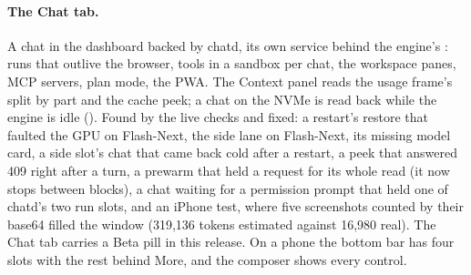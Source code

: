 \paragraph{The Chat tab.} A chat in the dashboard backed by chatd, its own service behind the engine's : runs that outlive the browser, tools in a sandbox per chat, the workspace panes, MCP servers, plan mode, the PWA. The Context panel reads the usage frame's split by part and the cache peek; a chat on the NVMe is read back while the engine is idle (). Found by the live checks and fixed: a restart's restore that faulted the GPU on Flash-Next, the side lane on Flash-Next, its missing model card, a side slot's chat that came back cold after a restart, a peek that answered 409 right after a turn, a prewarm that held a request for its whole read (it now stops between blocks), a chat waiting for a permission prompt that held one of chatd's two run slots, and an iPhone test, where five screenshots counted by their base64 filled the window (319,136 tokens estimated against 16,980 real). The Chat tab carries a Beta pill in this release. On a phone the bottom bar has four slots with the rest behind More, and the composer shows every control.

